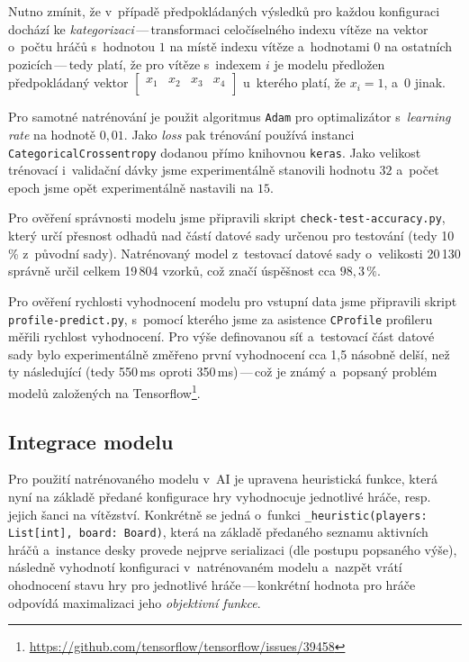 \documentclass[11pt, a4paper]{article}
\theoremstyle{definition}
\begin{document}
Nutno zmínit, že v~případě předpokládaných výsledků pro každou konfiguraci dochází ke \emph{kategorizaci}\,---\,transformaci celočíselného indexu vítěze na vektor o~počtu hráčů s~hodnotou $1$ na místě indexu vítěze a~hodnotami $0$ na ostatních pozicích\,---\,tedy platí, že pro vítěze s~indexem $i$ je modelu předložen předpokládaný vektor $\begin{bmatrix}
  x_1 & x_2 & x_3 & x_4 \\
\end{bmatrix}$ u~kterého platí, že $x_i = 1$, a~$0$ jinak.

Pro samotné natrénování je použit algoritmus \texttt{Adam} pro optimalizátor s~\emph{learning rate} na hodnotě $0,01$. Jako \emph{loss} pak trénování používá instanci \texttt{CategoricalCrossentropy} dodanou přímo knihovnou \texttt{keras}.
Jako velikost trénovací i~validační dávky jsme experimentálně stanovili hodnotu $32$ a~počet epoch jsme opět experimentálně nastavili na $15$.

Pro ověření správnosti modelu jsme připravili skript \texttt{check-test-accuracy.py}, který určí přesnost odhadů nad částí datové sady určenou pro testování (tedy 10\,\% z~původní sady). Natrénovaný model z~testovací datové sady o~velikosti
20\,130 správně určil celkem 19\,804 vzorků, což značí úspěšnost cca $ 98,3\,\% $.

Pro ověření rychlosti vyhodnocení modelu pro vstupní data jsme připravili skript \texttt{profile-predict.py}, s~pomocí kterého jsme za asistence \texttt{CProfile} profileru měřili rychlost vyhodnocení. Pro výše definovanou síť a~testovací část datové sady bylo experimentálně změřeno první vyhodnocení cca 1,5 násobně delší, než ty následující (tedy 550\,ms oproti 350\,ms)\,---\,což je známý a~popsaný problém modelů založených na Tensorflow\footnote{\url{https://github.com/tensorflow/tensorflow/issues/39458}}.

\subsection{Integrace modelu}
\label{subsec:model-integration}
Pro použití natrénovaného modelu v~AI je upravena heuristická funkce, která nyní na základě předané konfigurace hry vyhodnocuje jednotlivé hráče, resp. jejich šanci na vítězství. Konkrétně se jedná o~funkci \texttt{\_heuristic(players: List[int], board: Board)}, která na základě předaného seznamu aktivních hráčů a~instance desky provede nejprve serializaci (dle postupu popsaného výše), následně vyhodnotí konfiguraci v~natrénovaném modelu a~nazpět vrátí ohodnocení stavu hry pro jednotlivé hráče\,---\,konkrétní hodnota pro hráče odpovídá maximalizaci jeho \emph{objektivní funkce}.
\end{document}
